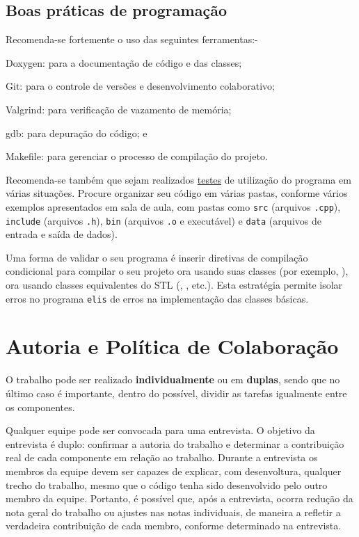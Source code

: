 \documentclass[11pt,a4paper]{article}
\begin{document}
\subsection*{Boas práticas de programação}
Recomenda-se fortemente o uso das seguintes ferramentas:-
\begin{itemize*}
    \item Doxygen: para a documentação de código e das classes;
    \item Git: para o controle de versões e desenvolvimento colaborativo;
    \item Valgrind: para verificação de vazamento de memória;
    \item gdb: para depuração do código; e
    \item Makefile: para gerenciar o processo de compilação do projeto.
\end{itemize*}

Recomenda-se também que sejam realizados \href{http://en.wikipedia.org/wiki/Software_testing}{testes}
de utilização do programa em várias situações.
Procure organizar seu código em várias pastas, conforme vários exemplos apresentados em
sala de aula, com pastas como
\texttt{src} (arquivos \texttt{.cpp}),
\texttt{include} (arquivos \texttt{.h}),
\texttt{bin} (arquivos \texttt{.o} e executável) e
\texttt{data} (arquivos de entrada e saída de dados).

Uma forma de validar o seu programa é inserir diretivas de compilação condicional
para compilar o seu projeto ora usando suas classes (por exemplo, ), ora
usando classes equivalentes do STL (, , etc.).
Esta estratégia permite isolar erros no programa \texttt{elis} de erros na implementação
das classes básicas.

\section{Autoria e Política de Colaboração}
%
O trabalho pode ser realizado \textbf{individualmente} ou em \textbf{duplas},
sendo que no último caso é importante, dentro do possível,
dividir as tarefas igualmente entre os componentes.

Qualquer equipe pode ser convocada para uma entrevista.
O objetivo da entrevista é duplo: confirmar a autoria do trabalho e
determinar a contribuição real de cada componente em relação ao trabalho.
Durante a entrevista os membros da equipe devem ser capazes de explicar,
com desenvoltura, qualquer trecho do trabalho, mesmo que o código tenha
sido desenvolvido pelo outro membro da equipe.
Portanto, é possível que, após a entrevista, ocorra redução da nota geral do trabalho ou
ajustes nas notas individuais, de maneira a refletir a verdadeira contribuição
de cada membro, conforme determinado na entrevista.
\end{document}
